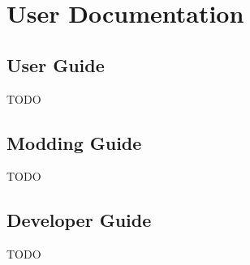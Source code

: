 \section{User Documentation} \label{sec:user_documentation}


\subsection{User Guide}
TODO

\subsection{Modding Guide}
TODO

\subsection{Developer Guide}
TODO
